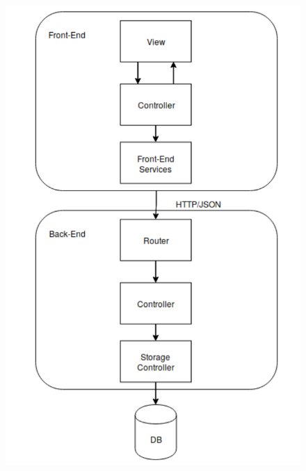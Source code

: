 \begin{legal}
\begin{legal}
\begin{figure}
			  		\includegraphics[width=\linewidth]{../images/design/MVC.png}
				\end{figure} 
				
			\end{legal}
			
  	\end{legal}
